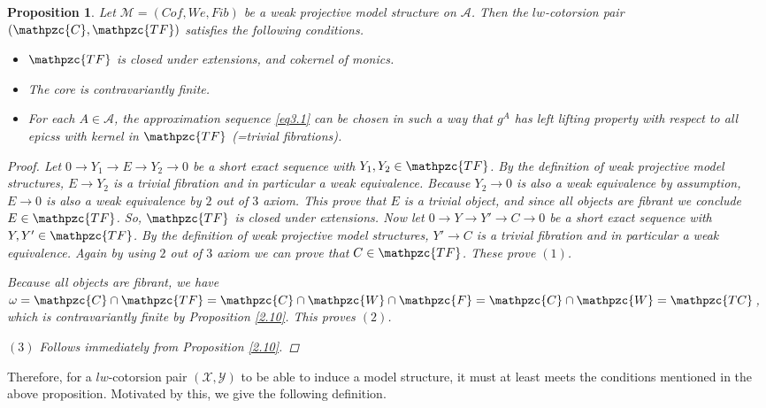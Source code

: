 \documentclass[12pt]{amsart}
\numberwithin{equation}{section}
\newtheorem{proposition}[lemma]{Proposition}
\theoremstyle{definition}
\newtheorem*{theorem 0*}{Theorem}
\newtheorem*{theorem a*}{Theorem A}
\newtheorem*{theorem b*}{Theorem B}
\numberwithin{diagram}{section}
\begin{document}
	\begin{proposition}\label{3.5}
   Let $\mathcal{M}=(Cof,We,Fib)$ be a weak projective model structure on $\mathcal{A}$. Then the $lw$-cotorsion pair $(\mathpzc{C},\mathpzc{TF})$ satisfies the following conditions.
   \begin{itemize}
   \item[(1)]
   $\mathpzc{TF}$ is closed under extensions, and cokernel of monics.
   \item[(2)]
   The core is contravariantly finite.
   \item[(3)]
   For each $A\in\mathcal{A}$, the approximation sequence \eqref{eq3.1} can be chosen in such a way that $g^A$ has left lifting property with respect to all epicss with kernel in $\mathpzc{TF}$ (=trivial fibrations).
   \end{itemize}
   \begin{proof}
   Let $0\rightarrow Y_1\rightarrow E\rightarrow Y_2\rightarrow 0$ be a short exact sequence with $Y_1,Y_2\in \mathpzc{TF}$. By the definition of weak projective model structures, $E\rightarrow Y_2$ is a trivial fibration and in particular a weak equivalence. Because $Y_2\rightarrow 0$ is also a weak equivalence by assumption, $E\rightarrow 0$ is also a weak equivalence by $2$ out of $3$ axiom. This prove that $E$ is a trivial object, and since all objects are fibrant we conclude $E\in \mathpzc{TF}$. So, $\mathpzc{TF}$ is closed under extensions. Now let $0\rightarrow Y\rightarrow Y'\rightarrow C\rightarrow 0$ be a short exact sequence with $Y,Y'\in \mathpzc{TF}$. By the definition of weak projective model structures, $Y'\rightarrow C$ is a trivial fibration and in particular a weak equivalence. Again by using $2$ out of $3$ axiom we can prove that $C\in \mathpzc{TF}$. These prove $(1)$.
  
  Because all objects are fibrant, we have $\omega=\mathpzc{C}\cap\mathpzc{TF}=\mathpzc{C}\cap\mathpzc{W}\cap\mathpzc{F}=\mathpzc{C}\cap\mathpzc{W}=\mathpzc{TC}$,
  which is contravariantly finite by Proposition \ref{2.10}. This proves $(2)$.
  
  $(3)$ Follows immediately from Proposition \ref{2.10}.
   \end{proof}
   \end{proposition}
Therefore, for a $lw$-cotorsion pair $(\mathcal{X},\mathcal{Y})$ to be able to induce a model structure, it must at least meets the conditions mentioned in the above proposition. Motivated by this, we give the following definition.
\end{document}
